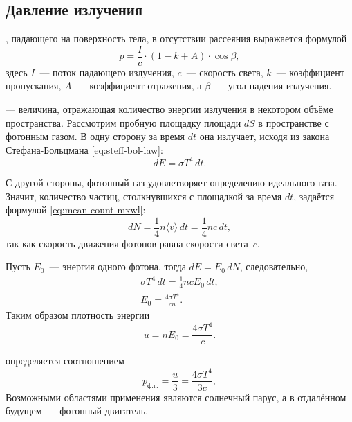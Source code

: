 \subsection{Давление излучения}
, падающего на поверхность тела, в отсутствии рассеяния выражается формулой
\begin{equation}
    p = \frac{I}{c} \cdot (1 - k + A) \cdot \cos \beta,
\end{equation}
здесь $I$~--- поток падающего излучения, $c$~--- скорость света, $k$~--- коэффициент пропускания, $A$~--- коэффициент отражения, а $\beta$~--- угол падения излучения.

 — величина, отражающая количество энергии излучения в некотором объёме пространства. Рассмотрим пробную  площадку площади $dS$ в пространстве с фотонным газом. В одну сторону за время $dt$ она излучает, исходя из закона Стефана-Больцмана \eqref{eq:steff-bol-law}:
\begin{equation*}
	d E = \sigma T^4 \, d t.
\end{equation*}

С другой стороны, фотонный газ удовлетворяет определению идеального газа. Значит, количество частиц, столкнувшихся с площадкой за время $dt$, задаётся формулой \eqref{eq:mean-count-mxwl}:
\begin{equation*}
d N = \frac{1}{4} n \langle v \rangle \, d t = \frac{1}{4} n c \, d t,
\end{equation*}
так как скорость движения фотонов равна скорости света~$c$.

Пусть $E_0$~--- энергия одного фотона, тогда $dE = E_0\,dN$, следовательно,
\begin{gather*}
    \sigma T^4 \, dt = \frac{1}{4} n c E_0 \, dt,\\
    E_0 = \frac{4 \sigma T^4}{c n}.
\end{gather*}
Таким образом плотность энергии
\begin{equation}
	u = n E_0 = \frac{4 \sigma T^4}{c}.
\end{equation}

 определяется соотношением
\begin{equation}
    p_\text{ф.г.} = \frac{u}{3} = \frac{4 \sigma T^4}{3c},
\end{equation}
Возможными областями применения являются солнечный парус, а в отдалённом будущем~--- фотонный двигатель.
